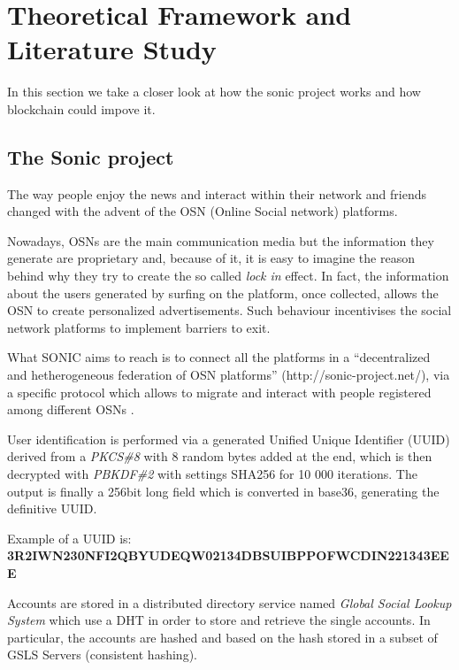 \section{Theoretical Framework and Literature Study}
\label{S:2}

In this section we take a closer look at how the sonic project works and how blockchain could impove it. 

\subsection{The Sonic project}

The way people enjoy the news and interact within their network and friends changed with the advent of the OSN (Online Social network) platforms. \par
Nowadays, OSNs are the main communication media but the information they generate are proprietary and, because of it, it is easy to imagine the reason behind why they try to create the so called \textit{lock in} effect.
In fact, the information about the users generated by surfing on the platform, once collected, allows the OSN to create personalized advertisements. Such behaviour incentivises the social network platforms to implement barriers to exit. \par
What SONIC aims to reach is to connect all the platforms in a ``decentralized and hetherogeneous federation of OSN platforms'' (http://sonic-project.net/), via a specific protocol which allows to migrate and interact with people registered among different OSNs \cite{gondor_sonic:_2014}. \par
User identification is performed via a generated Unified Unique Identifier (UUID) derived from a \textit{PKCS\#8} \cite{pkcs8}with 8 random bytes added at the end, which is then decrypted with \textit{PBKDF\#2} \cite{pkcs8} with settings SHA256 \cite{hansen_us} for 10 000 iterations.
The output is finally a 256bit long field which is converted in base36, generating the definitive UUID. \par

Example of a UUID is: \\ \textbf{3R2IWN230NFI2QBYUDEQW02134DBSUIBPPOFWCDIN221343EEE} \par

Accounts are stored in a distributed directory service named \textit{Global Social Lookup System} which use a DHT in order to store and retrieve the single accounts. In particular, the accounts are hashed and based on the hash stored in a subset of GSLS Servers (consistent hashing). \par

